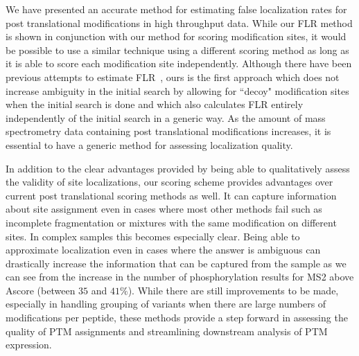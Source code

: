 \documentclass[11pt]{article}
\begin{document}
{We have presented an accurate method for estimating false localization rates for post translational modifications in high throughput data. While our FLR method is shown in conjunction with our method for scoring modification sites, it would be possible to use a similar technique using a different scoring method as long as it is able to score each modification site independently. Although there have been previous attempts to estimate FLR~\cite{Baker2011}, ours is the first approach which does not increase ambiguity in the initial search by allowing for ``decoy" modification sites when the initial search is done and which also calculates FLR entirely independently of the initial search in a generic way. As the amount of mass spectrometry data containing post translational modifications increases, it is essential to have a generic method for assessing localization quality. 

In addition to the clear advantages provided by being able to qualitatively assess the validity of site localizations, our scoring scheme provides advantages over current post translational scoring methods as well. It can capture information about site assignment even in cases where most other methods fail such as incomplete fragmentation or mixtures with the same modification on different sites. In complex samples this becomes especially clear. Being able to approximate localization even in cases where the answer is ambiguous can drastically increase the information that can be captured from the sample as we can see from the increase in the number of phosphorylation results for MS2 above Ascore (between $35$ and $41\%$). While there are still improvements to be made, especially in handling grouping of variants when there are large numbers of modifications per peptide, these methods provide a step forward in assessing the quality of PTM assignments and streamlining downstream analysis of PTM expression. 




\clearpage
\appendix
\renewcommand\thesection{Appendix~\Alph{section}}
\renewcommand{\thefigure}{\Alph{section}-\arabic{figure}}  %
\setcounter{section}{0}

 \clearpage
 \clearpage
 \clearpage


}
\end{document}
